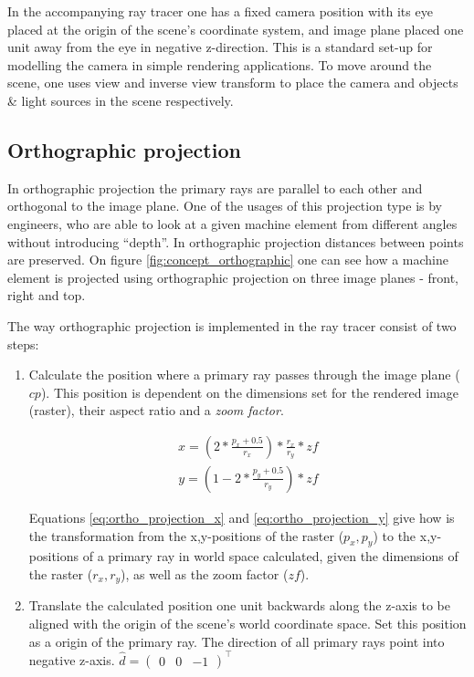 \documentclass{article}
\begin{document}
In the accompanying ray tracer one has a fixed camera position with its eye placed at the origin of the scene's coordinate system, and image plane placed one unit away from the eye in negative z-direction. This is a standard set-up for modelling the camera in simple rendering applications. To move around the scene, one uses view and inverse view transform to place the camera and objects \& light sources in the scene respectively. 

\subsection*{Orthographic projection}
In orthographic projection the primary rays are parallel to each other and orthogonal to the image plane. One of the usages of this projection type is by engineers, who are able to look at a given machine element from different angles without introducing ``depth''. In orthographic projection distances between points are preserved. On figure \ref{fig:concept_orthographic} one can see how a machine element is projected using orthographic projection on three image planes - front, right and top. 

\vspace*{\baselineskip}

The way orthographic projection is implemented in the ray tracer consist of two steps: 

\begin{enumerate}[1.]	

\item Calculate the position where a primary ray passes through the image plane ($cp$). This position is dependent on the dimensions set for the rendered image (raster), their aspect ratio and a \textit{zoom factor}.

\begin{align}
x = (2 * \frac{p_{x} + 0.5}{r_{x}}) * \frac{r_{x}}{r_{y}} * zf
\label{eq:ortho_projection_x}
\end{align}
\begin{align}
y = (1 - 2 * \frac{p_{y} + 0.5}{r_{y}}) * zf
\label{eq:ortho_projection_y}
\end{align}

Equations \ref{eq:ortho_projection_x} and \ref{eq:ortho_projection_y} give how is the transformation from the x,y-positions of the raster ($p_{x}, p_{y}$) to the x,y-positions of a primary ray in world space calculated, given the dimensions of the raster ($r_{x}, r_{y}$), as well as the zoom factor ($zf$).

\item Translate the calculated position one unit backwards along the z-axis to be aligned with the origin of the scene's world coordinate space. Set this position as a origin of the primary ray. The direction of all primary rays point into negative z-axis. $\hat{d} = \begin{pmatrix}0&0&-1\end{pmatrix}^\top$

\end{enumerate}
\end{document}
